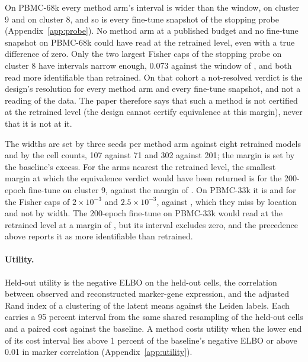 \documentclass{article}
\begin{document}
On PBMC-68k every method arm's interval is wider than the window,  on cluster 9 and  on cluster 8, and so is every fine-tune snapshot of the stopping probe (Appendix~\ref{app:probe}). No method arm at a published budget and no fine-tune snapshot on PBMC-68k could have read at the retrained level, even with a true difference of zero. Only the two largest Fisher caps of the stopping probe on cluster 8 have intervals narrow enough, 0.073 against the window of , and both read more identifiable than retrained. On that cohort a not-resolved verdict is the design's resolution for every method arm and every fine-tune snapshot, and not a reading of the data. The paper therefore says that such a method is not certified at the retrained level (the design cannot certify equivalence at this margin), never that it is not at it.

The widths are set by three seeds per method arm against eight retrained models and by the cell counts, 107 against 71 and 302 against 201; the margin is set by the baseline's excess. For the arms nearest the retrained level, the smallest margin at which the equivalence verdict would have been returned is  for the 200-epoch fine-tune on cluster 9, against the margin of . On PBMC-33k it is  and  for the Fisher caps of $2\times 10^{-3}$ and $2.5\times 10^{-3}$, against , which they miss by location and not by width. The 200-epoch fine-tune on PBMC-33k would read at the retrained level at a margin of , but its interval excludes zero, and the precedence above reports it as more identifiable than retrained.

\paragraph{Utility.} Held-out utility is the negative ELBO on the held-out cells, the correlation between observed and reconstructed marker-gene expression, and the adjusted Rand index of a clustering of the latent means against the Leiden labels. Each carries a 95 percent interval from the same shared resampling of the held-out cells and a paired cost against the baseline. A method costs utility when the lower end of its cost interval lies above 1 percent of the baseline's negative ELBO or above 0.01 in marker correlation (Appendix~\ref{app:utility}).
\end{document}
